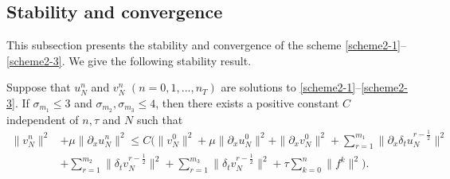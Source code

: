 \documentclass[10pt]{siamltex}
\newcommand{\px}[1][x]{\partial_{#1}}
\newcommand{\mfrac}[1][2]{\frac{1}{2}}
\begin{document}
\subsection{Stability and convergence}\label{sec4-3}
This subsection presents
 the stability and convergence of the scheme \eqref{scheme2-1}--\eqref{scheme2-3}.
We  give the following stability result.
\begin{theorem}\label{thm:stability}
Suppose that $u_N^n$ and $v_N^n$  $(n=0,1,...,n_T)$ are solutions to
\eqref{scheme2-1}--\eqref{scheme2-3}.
If $\sigma_{m_1}\leq3$ and $\sigma_{m_2},\sigma_{m_3}\leq 4$,
then there exists a positive constant $C$ independent of $n,\tau$ and $N$ such that
\begin{eqnarray}
\|v_N^{n}\|^2 &+\mu\|\px[x]u_N^{n}\|^2\leq C\bigg(\|v_N^{0}\|^2 +\mu\|\px[x]u_N^{0}\|^2+\|\px[x]v_N^{0}\|^2
+ \sum_{r=1}^{m_1} \|\px[x]\delta_tu_N^{r-\mfrac}\|^2 \nonumber\\
&+  \sum_{r=1}^{m_2}\|\delta_tv_N^{r-\mfrac}\|^2+ \sum_{r=1}^{m_3}\|\delta_tv_N^{r-\mfrac}\|^2
+\tau\sum_{k=0}^{n}\|f^{k}\|^2\bigg).\label{s5:eq-8}
\end{eqnarray}
\end{theorem}
\end{document}
